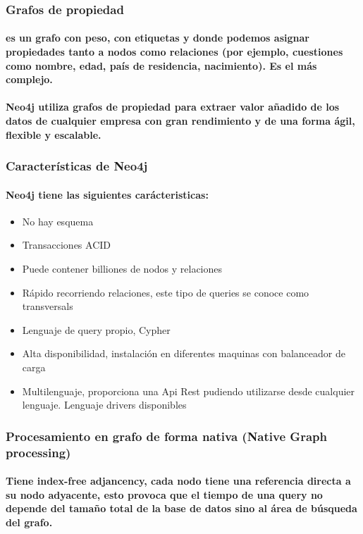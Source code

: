 \subsubsection{Grafos de propiedad}
	\paragraph{es un grafo con peso, con etiquetas y donde podemos asignar propiedades tanto a nodos como relaciones (por ejemplo, cuestiones como nombre, edad, país de residencia, nacimiento). Es el más complejo.}
	\paragraph{Neo4j utiliza grafos de propiedad para extraer valor añadido de los datos de cualquier empresa con gran rendimiento y de una forma ágil, flexible y escalable.}	

\subsubsection{Características de Neo4j}
\paragraph{Neo4j tiene las siguientes carácteristicas:}
\begin{itemize}
	\item No hay esquema
	\item Transacciones ACID
	\item Puede contener billiones de nodos y relaciones
	\item Rápido recorriendo relaciones, este tipo de queries se conoce como transversals
	\item Lenguaje de query propio, Cypher
	\item Alta disponibilidad, instalación en diferentes maquinas con balanceador de carga
	\item Multilenguaje, proporciona una Api Rest pudiendo utilizarse desde cualquier lenguaje. Lenguaje drivers 			disponibles
\end{itemize}   

\subsubsection{Procesamiento en grafo de forma nativa (Native Graph processing)}
    \paragraph{Tiene index-free adjancency, cada nodo tiene una referencia directa a su nodo adyacente, esto provoca    que el tiempo de una query no depende del tamaño total de la base de datos sino al área de búsqueda del grafo.}
